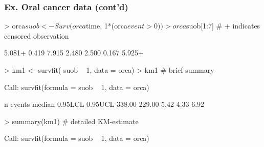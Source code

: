 \documentclass[handout,12pt,dvipsnames,t]{beamer}
\begin{document}
\begin{frame}[fragile]
\frametitle{Ex. Oral cancer data  (cont'd)}



{\scriptsize
\begin{Schunk}
\begin{Sinput}
> orca$suob <- Surv(orca$time, 1*(orca$event > 0) )
> orca$suob[1:7]   #  + indicates censored observation
\end{Sinput}
\begin{Soutput}
[1] 5.081+ 0.419  7.915  2.480  2.500  0.167  5.925+
\end{Soutput}
\end{Schunk}
}

{\scriptsize
\begin{Schunk}
\begin{Sinput}
> km1 <- survfit( suob ~ 1, data = orca)
> km1              #  brief  summary
\end{Sinput}
\begin{Soutput}
Call: survfit(formula = suob ~ 1, data = orca)

      n  events  median 0.95LCL 0.95UCL 
 338.00  229.00    5.42    4.33    6.92 
\end{Soutput}
\end{Schunk}
}

{\scriptsize
\begin{Schunk}
\begin{Sinput}
> summary(km1)     #  detailed KM-estimate
\end{Sinput}
\begin{Soutput}
Call: survfit(formula = suob ~ 1, data = orca)


\end{Soutput}
\end{Schunk}}
\end{frame}
\end{document}
